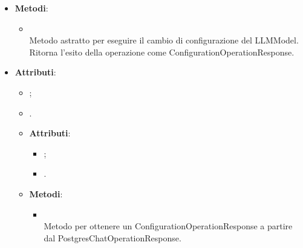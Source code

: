 \documentclass[10pt, a4paper]{article}
\begin{document}
\label{ChangeConfigurationUseCaseDettaglio}
\begin{itemize}
    \item \textbf{Metodi}:
    \begin{itemize}
        \item {}\\
        Metodo astratto per eseguire il cambio di configurazione del LLMModel. Ritorna l'esito della operazione come ConfigurationOperationResponse.
    \end{itemize}
\end{itemize}

\label{ConfigurationOperationResponseDettaglio}
\begin{itemize}
    \item \textbf{Attributi}:
    \begin{itemize}
        \item {};
        \item {}.
    \end{itemize}
    
    \label{PostgresConfigurationOperationResponseDettaglio}
    \begin{itemize}
        
        \item \textbf{Attributi}:
        \begin{itemize}
        \item {};
        \item {}.
        \end{itemize}
        \item \textbf{Metodi}:
        \begin{itemize}
            \item {}\\
            Metodo per ottenere un ConfigurationOperationResponse a partire dal PostgresChatOperationResponse.
        \end{itemize}
        
    \end{itemize}
    
\end{itemize}
    
\end{document}
